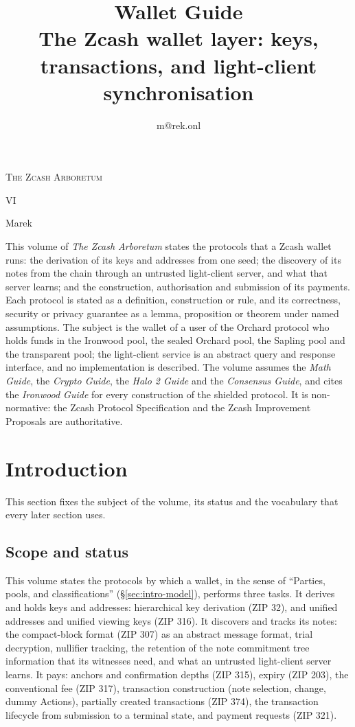 \documentclass[11pt,a4paper]{article}
\title{\textbf{\Huge Wallet Guide}\\[6pt]\large The Zcash wallet layer: keys, transactions, and light-client synchronisation}
\author{m@rek.onl}
\date{}
\makeatletter
\theoremstyle{definition}
\let\arb@tableofcontents\tableofcontents
\renewcommand{\tableofcontents}{{\hypersetup{pdfborderstyle={/S/U/W 0}}%
  \arb@tableofcontents}}
\providecommand{\accession}{}
\def\arb@name#1#2\@nil{\def\arbvolname{#2}}
\def\arb@parsetitle\textbf#1\\[#2]#3#4\@nil{\arb@name#1\@nil\def\arb@sub{#4}}
\providecommand{\arbvolname}{}
\renewcommand{\maketitle}{\expandafter\arb@parsetitle\@title\@nil
  \hypersetup{pdftitle={\arbvolname: \arb@sub},pdfauthor={Marek}}%
  \thispagestyle{empty}\begingroup\raggedright
  {\fontsize{13.2}{16}\selectfont\scshape The Zcash Arboretum\par}
  \vspace*{50mm}
  {\fontsize{47.3}{50}\selectfont\accession\par}
  \vspace{6mm}
  {\fontsize{22.8}{27}\selectfont\arbvolname\par}
  \vspace{3mm}
  {\fontsize{13.2}{17}\selectfont\arb@sub\par}
  \vspace{18mm}
  {\fontsize{13.2}{17}\selectfont Marek\par}
  {\small\@author\par}
  \endgroup\clearpage}
\renewenvironment{abstract}{%
  \small\begin{center}{\bfseries\abstractname}\end{center}\medskip\noindent\ignorespaces
}{\par\medskip}
\renewcommand{\accession}{VI}
\makeatother
\begin{document}
\maketitle

\begin{abstract}
This volume of \emph{The Zcash Arboretum} states the protocols that a Zcash
wallet runs: the derivation of its keys and addresses from one seed; the
discovery of its notes from the chain through an untrusted light-client
server, and what that server learns; and the construction, authorisation and
submission of its payments. Each protocol is stated as a definition,
construction or rule, and its correctness, security or privacy guarantee as
a lemma, proposition or theorem under named assumptions. The subject is the
wallet of a user of the Orchard protocol who holds funds in the Ironwood
pool, the sealed Orchard pool, the Sapling pool and the transparent pool;
the light-client service is an abstract query and response interface, and
no implementation is described. The volume assumes the \emph{Math Guide},
the \emph{Crypto Guide}, the \emph{Halo 2 Guide} and the \emph{Consensus
Guide}, and cites the \emph{Ironwood Guide} for every construction of the
shielded protocol. It is non-normative: the Zcash Protocol Specification and
the Zcash Improvement Proposals are authoritative.
\end{abstract}
\clearpage
\tableofcontents
\clearpage

\section{Introduction}\label{sec:intro}

This section fixes the subject of the volume, its status and the vocabulary
that every later section uses.

\subsection{Scope and status}\label{sec:intro-scope}

This volume states the protocols by which a wallet, in the sense of
``Parties, pools, and classifications'' (\S\ref{sec:intro-model}), performs
three tasks. It derives and holds keys and addresses: hierarchical key
derivation (ZIP 32), and unified addresses and unified viewing keys
(ZIP 316). It discovers and tracks its notes: the compact-block format
(ZIP 307) as an abstract message format, trial decryption, nullifier
tracking, the retention of the note commitment tree information that its
witnesses need, and what an untrusted light-client server learns. It pays:
anchors and confirmation depths (ZIP 315), expiry (ZIP 203), the
conventional fee (ZIP 317), transaction construction (note selection,
change, dummy Actions), partially created transactions (ZIP 374), the
transaction lifecycle from submission to a terminal state, and payment
requests (ZIP 321).
\end{document}
